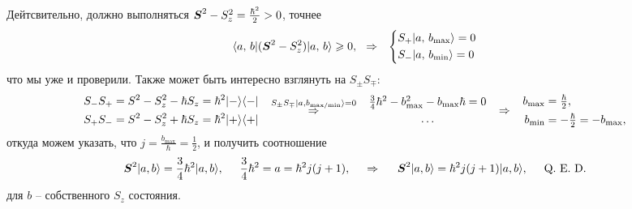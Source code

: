 Дейтсвительно, должно выполняться $\mbox{\boldmath $S$}^2 - S_z^2 = \frac{\hbar^2}{2} > 0$, точнее
\begin{equation*}
    \langle a,\, b| (\mbox{\boldmath $S$}^2 - S_z^2) | a,\, b\rangle \geqslant 0,
    \hspace{0.25cm} \Rightarrow \hspace{0.25cm}
    \left\{\begin{aligned}
        &S_+ | a,\, b_{\text{max}}\rangle = 0 \\
        &S_- | a,\, b_{\text{min}}\rangle = 0 \\
    \end{aligned}\right.
\end{equation*}
что мы уже и проверили. Также может быть интересно взглянуть на $S_\pm S_\mp$:
\begin{equation*}
    \left.\begin{aligned}
        S_{-} S_+ &= S^2 - S_z^2 - \hbar S_z = \hbar^2 | - \rangle \langle - | \\ 
        S_{+} S_- &= S^2 - S_z^2 + \hbar S_z = \hbar^2 | + \rangle \langle + | \\         
    \end{aligned}\right.
    \hspace{0.25cm} \overset{S_{\pm} S_{\mp} | a,b_{\text{max/min}}\rangle = 0}{\Rightarrow}  \hspace{0.25cm} 
    \left.\begin{gathered}
        \textstyle \frac{3}{4} \hbar^2 - b_{\text{max}}^2 - b_{\text{max}} \hbar = 0 \\
        \ldots
    \end{gathered}\right.
    \hspace{0.25cm} \Rightarrow \hspace{0.25cm}
    \left.\begin{aligned}
        b_{\text{max}} &= \textstyle \frac{\hbar}{2}, \\
        b_{\text{min}} &= \textstyle -\frac{\hbar}{2} = - b_{\text{max}},\\
    \end{aligned}\right.
\end{equation*}
откуда можем указать, что $j = \frac{b_{\text{max}}}{\hbar} = \frac{1}{2}$, и получить соотношение
\begin{equation*}
    \mbox{\boldmath $S$}^2 | a, b\rangle = \frac{3}{4} \hbar^2 | a,b\rangle,
    \hspace{5 mm}  
    \frac{3}{4} \hbar^2 = a = \hbar^2 j(j+1),
    \hspace{0.5cm} \Rightarrow \hspace{0.5cm}
    \mbox{\boldmath $S$}^2 | a, b\rangle = \hbar^2 j(j+1) | a, b\rangle, 
    \hspace{5 mm} \text{Q. E. D.}
\end{equation*}
для $b$ -- собственного $S_z$ состояния. 




